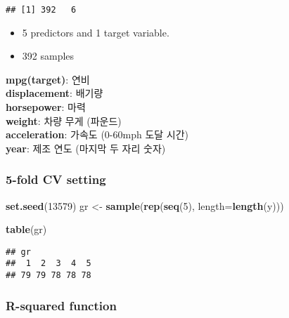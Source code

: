 \documentclass[
]{article}
\newenvironment{Shaded}{\begin{snugshade}}{\end{snugshade}}
\newcommand{\AttributeTok}[1]{\textcolor[rgb]{0.13,0.29,0.53}{#1}}
\newcommand{\DecValTok}[1]{\textcolor[rgb]{0.00,0.00,0.81}{#1}}
\newcommand{\FunctionTok}[1]{\textcolor[rgb]{0.13,0.29,0.53}{\textbf{#1}}}
\newcommand{\NormalTok}[1]{#1}
\newcommand{\OtherTok}[1]{\textcolor[rgb]{0.56,0.35,0.01}{#1}}
\providecommand{\tightlist}{%
  \setlength{\itemsep}{0pt}\setlength{\parskip}{0pt}}
\begin{document}
\begin{verbatim}
## [1] 392   6
\end{verbatim}

\begin{itemize}
\tightlist
\item
  5 predictors and 1 target variable.\\
\item
  392 samples
\end{itemize}

\textbf{mpg(target)}: 연비\\
\textbf{displacement}: 배기량\\
\textbf{horsepower}: 마력\\
\textbf{weight}: 차량 무게 (파운드)\\
\textbf{acceleration}: 가속도 (0-60mph 도달 시간)\\
\textbf{year}: 제조 연도 (마지막 두 자리 숫자)

\subsubsection{5-fold CV setting}\label{fold-cv-setting}

\begin{Shaded}
\begin{Highlighting}[]
\FunctionTok{set.seed}\NormalTok{(}\DecValTok{13579}\NormalTok{)}
\NormalTok{gr }\OtherTok{\textless{}{-}} \FunctionTok{sample}\NormalTok{(}\FunctionTok{rep}\NormalTok{(}\FunctionTok{seq}\NormalTok{(}\DecValTok{5}\NormalTok{), }\AttributeTok{length=}\FunctionTok{length}\NormalTok{(y)))}
\end{Highlighting}
\end{Shaded}

\begin{Shaded}
\begin{Highlighting}[]
\FunctionTok{table}\NormalTok{(gr)}
\end{Highlighting}
\end{Shaded}

\begin{verbatim}
## gr
##  1  2  3  4  5 
## 79 79 78 78 78
\end{verbatim}

\subsubsection{R-squared function}\label{r-squared-function}
\end{document}
